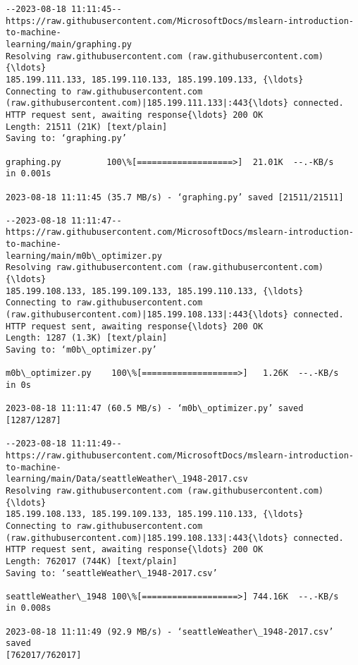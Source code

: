 \documentclass[11pt]{article}
\begin{document}
    \begin{Verbatim}[commandchars=\\\{\}]
--2023-08-18 11:11:45--
https://raw.githubusercontent.com/MicrosoftDocs/mslearn-introduction-to-machine-
learning/main/graphing.py
Resolving raw.githubusercontent.com (raw.githubusercontent.com){\ldots}
185.199.111.133, 185.199.110.133, 185.199.109.133, {\ldots}
Connecting to raw.githubusercontent.com
(raw.githubusercontent.com)|185.199.111.133|:443{\ldots} connected.
HTTP request sent, awaiting response{\ldots} 200 OK
Length: 21511 (21K) [text/plain]
Saving to: ‘graphing.py’

graphing.py         100\%[===================>]  21.01K  --.-KB/s    in 0.001s

2023-08-18 11:11:45 (35.7 MB/s) - ‘graphing.py’ saved [21511/21511]

--2023-08-18 11:11:47--
https://raw.githubusercontent.com/MicrosoftDocs/mslearn-introduction-to-machine-
learning/main/m0b\_optimizer.py
Resolving raw.githubusercontent.com (raw.githubusercontent.com){\ldots}
185.199.108.133, 185.199.109.133, 185.199.110.133, {\ldots}
Connecting to raw.githubusercontent.com
(raw.githubusercontent.com)|185.199.108.133|:443{\ldots} connected.
HTTP request sent, awaiting response{\ldots} 200 OK
Length: 1287 (1.3K) [text/plain]
Saving to: ‘m0b\_optimizer.py’

m0b\_optimizer.py    100\%[===================>]   1.26K  --.-KB/s    in 0s

2023-08-18 11:11:47 (60.5 MB/s) - ‘m0b\_optimizer.py’ saved [1287/1287]

--2023-08-18 11:11:49--
https://raw.githubusercontent.com/MicrosoftDocs/mslearn-introduction-to-machine-
learning/main/Data/seattleWeather\_1948-2017.csv
Resolving raw.githubusercontent.com (raw.githubusercontent.com){\ldots}
185.199.108.133, 185.199.109.133, 185.199.110.133, {\ldots}
Connecting to raw.githubusercontent.com
(raw.githubusercontent.com)|185.199.108.133|:443{\ldots} connected.
HTTP request sent, awaiting response{\ldots} 200 OK
Length: 762017 (744K) [text/plain]
Saving to: ‘seattleWeather\_1948-2017.csv’

seattleWeather\_1948 100\%[===================>] 744.16K  --.-KB/s    in 0.008s

2023-08-18 11:11:49 (92.9 MB/s) - ‘seattleWeather\_1948-2017.csv’ saved
[762017/762017]

    \end{Verbatim}
\end{document}
